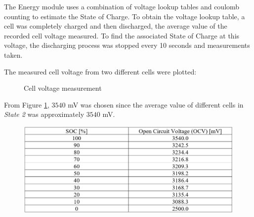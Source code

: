 \documentclass[11pt, a4paper]{article}
\begin{document}
The Energy module uses a combination of voltage lookup tables and coulomb counting to estimate the State of Charge. To obtain the voltage lookup table, a cell was completely charged and then discharged, the average value of the recorded cell voltage measured. To find the associated State of Charge at this voltage, the discharging process was stopped every 10 seconds and measurements taken.

The measured cell voltage from two different cells were plotted: 
\begin{figure}[h!]
    \centering
    \qquad
    \caption{Cell voltage measurement}
    \label{fig:Cell}
\end{figure}


From Figure \ref{fig:Cell}, $3540$ mV was chosen since the average value of different cells in \textit{State 2} was approximately $3540$ mV. 

\begin{figure} [h!]
    \centering
    \includegraphics[scale=0.6]{Energy_SOC.JPG}
\end{figure}
\end{document}
